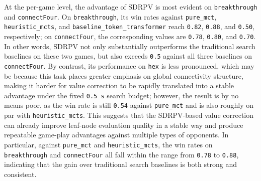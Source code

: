 At the per-game level, the advantage of SDRPV is most evident on \texttt{breakthrough} and \texttt{connectFour}. On \texttt{breakthrough}, its win rates against \texttt{pure_mct}, \texttt{heuristic_mcts}, and \texttt{baseline_token_transformer} reach \texttt{0.82}, \texttt{0.88}, and \texttt{0.50}, respectively; on \texttt{connectFour}, the corresponding values are \texttt{0.78}, \texttt{0.80}, and \texttt{0.70}. In other words, SDRPV not only substantially outperforms the traditional search baselines on these two games, but also exceeds \texttt{0.5} against all three baselines on \texttt{connectFour}. By contrast, its performance on \texttt{hex} is less pronounced, which may be because this task places greater emphasis on global connectivity structure, making it harder for value correction to be rapidly translated into a stable advantage under the fixed \texttt{0.5 s} search budget; however, the result is by no means poor, as the win rate is still \texttt{0.54} against \texttt{pure_mct} and is also roughly on par with \texttt{heuristic_mcts}. This suggests that the SDRPV-based value correction can already improve leaf-node evaluation quality in a stable way and produce repeatable game-play advantages against multiple types of opponents. In particular, against \texttt{pure_mct} and \texttt{heuristic_mcts}, the win rates on \texttt{breakthrough} and \texttt{connectFour} all fall within the range from \texttt{0.78} to \texttt{0.88}, indicating that the gain over traditional search baselines is both strong and consistent.



